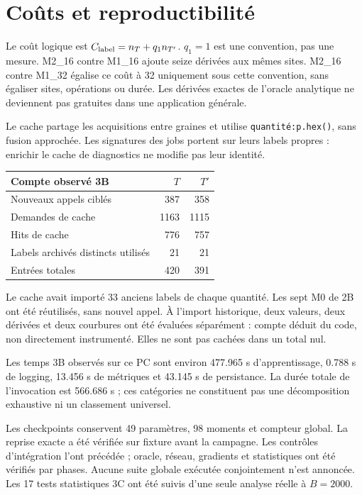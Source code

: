 \documentclass[11pt,a4paper]{article}
\begin{document}
\clearpage
\section{Coûts et reproductibilité}
Le coût logique est $C_{\rm label}=n_T+q_1n_{T'}$.
$q_1=1$ est une convention, pas une mesure.
M2\_16 contre M1\_16 ajoute seize dérivées aux mêmes sites.
M2\_16 contre M1\_32 égalise ce coût à 32 uniquement sous cette convention,
sans égaliser sites, opérations ou durée. Les dérivées exactes de l'oracle
analytique ne deviennent pas gratuites dans une application générale.

Le cache partage les acquisitions entre graines et utilise
\texttt{quantité:p.hex()}, sans fusion approchée. Les signatures des jobs
portent sur leurs labels propres : enrichir le cache de diagnostics
ne modifie pas leur identité.
\begin{center}
\begin{tabular}{lrr}
\toprule
Compte observé 3B & $T$ & $T'$\\
\midrule
Nouveaux appels ciblés & 387 & 358\\
Demandes de cache & 1163 & 1115\\
Hits de cache & 776 & 757\\
Labels archivés distincts utilisés & 21 & 21\\
Entrées totales & 420 & 391\\
\bottomrule
\end{tabular}
\end{center}
Le cache avait importé 33 anciens labels de chaque quantité.
Les sept M0 de 2B ont été réutilisés, sans nouvel appel.
À l'import historique, deux valeurs, deux dérivées et deux courbures
ont été évaluées séparément : compte déduit du code, non directement
instrumenté. Elles ne sont pas cachées dans un total nul.

Les temps 3B observés sur ce PC sont environ 477.965 s d'apprentissage,
0.788 s de logging, 13.456 s de métriques et 43.145 s de persistance.
La durée totale de l'invocation est 566.686 s ; ces catégories ne
constituent pas une décomposition exhaustive ni un classement universel.

Les checkpoints conservent 49 paramètres, 98 moments et compteur global.
La reprise exacte a été vérifiée sur fixture avant la campagne.
Les contrôles d'intégration l'ont précédée ; oracle, réseau, gradients
et statistiques ont été vérifiés par phases. Aucune suite globale exécutée
conjointement n'est annoncée. Les 17 tests statistiques 3C ont été suivis
d'une seule analyse réelle à $B=2000$.
\end{document}
